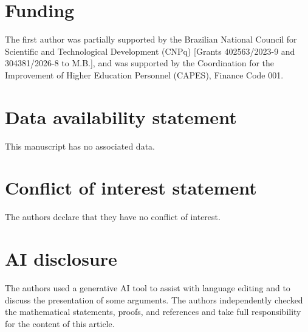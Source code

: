 \documentclass[11pt]{amsart}
\numberwithin{equation}{section}
\theoremstyle{definition}
\theoremstyle{remark}
\begin{document}
\section*{Funding}
The first author was partially supported by the Brazilian National Council for Scientific and Technological Development (CNPq) [Grants 402563/2023-9 and 304381/2026-8 to M.B.], and was supported by the Coordination for the Improvement of Higher Education Personnel (CAPES), Finance Code 001.

\section*{Data availability statement}
This manuscript has no associated data.
\section*{Conflict of interest statement}
The authors declare that they have no conflict of interest.

\section*{AI disclosure}
The authors used a generative AI tool to assist with language editing and to discuss the presentation of some arguments. The authors independently checked the mathematical statements, proofs, and references and take full responsibility for the content of this article.
\end{document}

